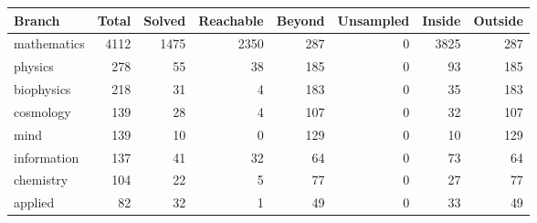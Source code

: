 \begin{tabular}{@{}lrrrrrrr@{}}
\toprule
Branch & Total & Solved & Reachable & Beyond & Unsampled & Inside & Outside \\
\midrule
mathematics & 4112 & 1475 & 2350 & 287 & 0 & 3825 & 287 \\
physics & 278 & 55 & 38 & 185 & 0 & 93 & 185 \\
biophysics & 218 & 31 & 4 & 183 & 0 & 35 & 183 \\
cosmology & 139 & 28 & 4 & 107 & 0 & 32 & 107 \\
mind & 139 & 10 & 0 & 129 & 0 & 10 & 129 \\
information & 137 & 41 & 32 & 64 & 0 & 73 & 64 \\
chemistry & 104 & 22 & 5 & 77 & 0 & 27 & 77 \\
applied & 82 & 32 & 1 & 49 & 0 & 33 & 49 \\
\bottomrule
\end{tabular}
